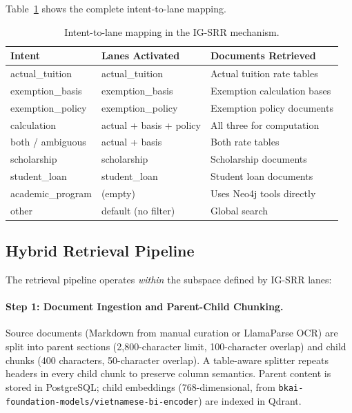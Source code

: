 \documentclass[runningheads]{llncs}
\begin{document}
Table~\ref{tab:lanes} shows the complete intent-to-lane mapping.

\begin{table}[t]
\centering
\caption{Intent-to-lane mapping in the IG-SRR mechanism.}
\label{tab:lanes}
\small
\begin{tabular}{@{}llp{5cm}@{}}
\toprule
\textbf{Intent} & \textbf{Lanes Activated} & \textbf{Documents Retrieved} \\
\midrule
actual\_tuition & actual\_tuition & Actual tuition rate tables \\
exemption\_basis & exemption\_basis & Exemption calculation bases \\
exemption\_policy & exemption\_policy & Exemption policy documents \\
calculation & actual + basis + policy & All three for computation \\
both / ambiguous & actual + basis & Both rate tables \\
scholarship & scholarship & Scholarship documents \\
student\_loan & student\_loan & Student loan documents \\
academic\_program & (empty) & Uses Neo4j tools directly \\
other & default (no filter) & Global search \\
\bottomrule
\end{tabular}
\end{table}

\subsection{Hybrid Retrieval Pipeline}
\label{sec:hybrid}

The retrieval pipeline operates \emph{within} the subspace defined by IG-SRR lanes:

\paragraph{Step 1: Document Ingestion and Parent-Child Chunking.}
Source documents (Markdown from manual curation or LlamaParse OCR) are split into parent sections (2,800-character limit, 100-character overlap) and child chunks (400 characters, 50-character overlap). A table-aware splitter repeats headers in every child chunk to preserve column semantics. Parent content is stored in PostgreSQL; child embeddings (768-dimensional, from \texttt{bkai-foundation-models/vietnamese-bi-encoder}) are indexed in Qdrant.
\end{document}
